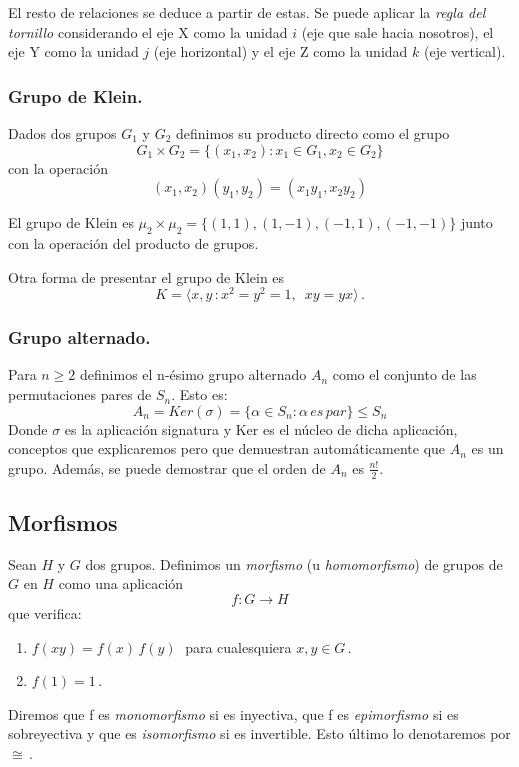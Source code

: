El resto de relaciones se deduce a partir de estas. Se puede aplicar la \textit{regla del tornillo} considerando el eje X como la unidad $i$ (eje que sale hacia nosotros), el eje Y como la unidad $j$ (eje horizontal) y el eje Z como la unidad $k$ (eje vertical).

\subsubsection{Grupo de Klein.}

\begin{ndef}
Dados dos grupos $G_1$ y $G_2$ definimos su producto directo como el grupo $$G_1 \times G_2 = \{(x_1,x_2):x_1 \in G_1,x_2 \in G_2\}$$ con la operación $$(x_1,x_2)(y_1,y_2) = (x_1y_1,x_2y_2)$$
\end{ndef}

El grupo de Klein es $\mu_2 \times \mu_2 = \{(1,1),(1,-1),(-1,1),(-1,-1)\}$ junto con la operación del producto de grupos.

Otra forma de presentar el grupo de Klein es \begin{equation*}
  K = \langle x, y \,: x^2 = y^2 = 1, \enspace xy = yx \rangle\,.
\end{equation*}

\subsubsection{Grupo alternado.}

Para $n \ge 2$ definimos el n-ésimo grupo alternado $A_n$ como el conjunto de las permutaciones pares de $S_n$. Esto es: $$A_n = Ker(\sigma) = \{\alpha \in S_n : \alpha \, es \, par\} \le S_n$$ Donde $\sigma$ es la aplicación signatura y Ker es el núcleo de dicha aplicación, conceptos que explicaremos pero que demuestran automáticamente que $A_n$ es un grupo. Además, se puede demostrar que el orden de $A_n$ es $\frac{n!}{2}$.

\subsection{Morfismos}

\begin{ndef}
Sean $H$ y $G$ dos grupos. Definimos un \textit{morfismo} (u \textit{homomorfismo}) de grupos de $G$ en $H$ como una aplicación \begin{equation*}
  f:G \to H
\end{equation*} que verifica: \begin{enumerate}
  \item $f(xy) = f(x)\,f(y) \;$ para cualesquiera $x,y \in G$\,.
  \item $f(1) = 1$\,.
\end{enumerate}

Diremos que f es \textit{monomorfismo} si es inyectiva, que f es \textit{epimorfismo} si es sobreyectiva y que es \textit{isomorfismo} si es invertible. Esto último lo denotaremos por $\cong$\,.
\end{ndef}

